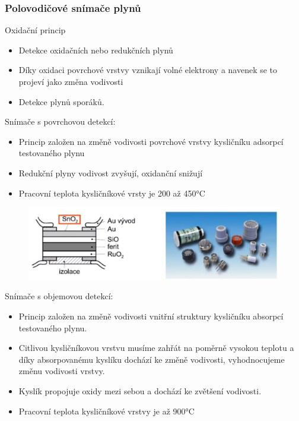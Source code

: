 \subsubsection{Polovodičové snímače plynů}
Oxidační princip
\begin{itemize}
    \item Detekce oxidačních nebo redukčních plynů
    \item Díky oxidaci povrchové vrstvy vznikají volné elektrony a navenek se to projeví jako změna vodivosti
    \item Detekce plynů sporáků.\\
\end{itemize}
Snímače s povrchovou detekcí:
\begin{itemize}
    \item Princip založen na změně vodivosti povrchové vrstvy kysličníku adsorpcí testovaného plynu
    \item Redukční plyny vodivost zvyšují, oxidanční snižují
    \item Pracovní teplota kysličníkové vrsty je 200 až 450°C
\end{itemize}
\begin{figure}[h!]
    \centering
    \includegraphics[scale = 0.1]{img/PovrchDetek.png}
\end{figure}
Snímače s objemovou detekcí:
\begin{itemize}
    \item Princip založen na změně vodivosti vnitřní struktury kysličníku absorpcí testovaného plynu.
    \item Citlivou kysličníkovou vrstvu musíme zahřát na poměrně vysokou teplotu a díky absorpovanému kyslíku dochází ke změně vodivosti, vyhodnocujeme změnu vodivosti vrstvy.
    \item Kyslík propojuje oxidy mezi sebou a dochází ke zvětšení vodivosti.
    \item Pracovní teplota kysličníkové vrstvy je až 900°C
\end{itemize}

